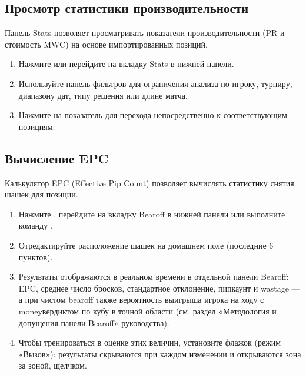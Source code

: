 \documentclass[letterpaper,10pt,russian]{sphinxmanual}
\begin{document}
\subsection{Просмотр статистики производительности}
\label{\detokenize{guide_utilisateur:afficher-les-statistiques-de-performance}}
\sphinxAtStartPar
Панель Stats позволяет просматривать показатели производительности (PR и стоимость MWC) на основе импортированных позиций.
\begin{enumerate}
%
\item {} 
\sphinxAtStartPar
Нажмите  или перейдите на вкладку Stats в нижней панели.

\item {} 
\sphinxAtStartPar
Используйте панель фильтров для ограничения анализа по игроку, турниру, диапазону дат, типу решения или длине матча.

\item {} 
\sphinxAtStartPar
Нажмите на показатель для перехода непосредственно к соответствующим позициям.

\end{enumerate}


\subsection{Вычисление EPC}
\label{\detokenize{guide_utilisateur:calculer-l-epc}}
\sphinxAtStartPar
Калькулятор EPC (Effective Pip Count) позволяет вычислять статистику снятия шашек для позиции.
\begin{enumerate}
%
\item {} 
\sphinxAtStartPar
Нажмите , перейдите на вкладку Bearoff в нижней панели или выполните команду .

\item {} 
\sphinxAtStartPar
Отредактируйте расположение шашек на домашнем поле (последние 6 пунктов).

\item {} 
\sphinxAtStartPar
Результаты отображаются в реальном времени в отдельной панели Bearoff: EPC, среднее число бросков, стандартное отклонение, пипкаунт и wastage — а при чистом bearoff также вероятность выигрыша игрока на ходу с money\sphinxhyphen{}вердиктом по кубу в точной области (см. раздел «Методология и допущения панели Bearoff» руководства).

\item {} 
\sphinxAtStartPar
Чтобы тренироваться в оценке этих величин, установите флажок  (режим «Вызов»): результаты скрываются при каждом изменении и открываются зона за зоной, щелчком.

\end{enumerate}
\end{document}
